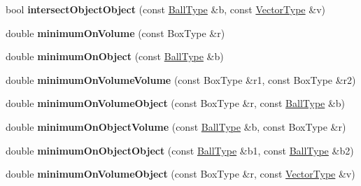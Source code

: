 \begin{DoxyCompactItemize}
\item 
\mbox{\label{struct_ball_point_stuff_ab88745ed3b3b54f82c410d91675f3be9}} 
bool {\bfseries intersect\+Object\+Object} (const \hyperlink{struct_ball}{Ball\+Type} \&b, const \hyperlink{struct_vector_type}{Vector\+Type} \&v)
\item 
\mbox{\label{struct_ball_point_stuff_a3d46c4b90956c91b849e6ceb4d2c8423}} 
double {\bfseries minimum\+On\+Volume} (const Box\+Type \&r)
\item 
\mbox{\label{struct_ball_point_stuff_a2a21e6a7f4ca3c45ede152799c1531f2}} 
double {\bfseries minimum\+On\+Object} (const \hyperlink{struct_ball}{Ball\+Type} \&b)
\item 
\mbox{\label{struct_ball_point_stuff_ae7bcb3f2b204fd91867535dcd869a433}} 
double {\bfseries minimum\+On\+Volume\+Volume} (const Box\+Type \&r1, const Box\+Type \&r2)
\item 
\mbox{\label{struct_ball_point_stuff_a3bcf3e32fe9b91adac660f17d14e15b1}} 
double {\bfseries minimum\+On\+Volume\+Object} (const Box\+Type \&r, const \hyperlink{struct_ball}{Ball\+Type} \&b)
\item 
\mbox{\label{struct_ball_point_stuff_ac5ff4bc8b68c12ea9342c2a525839bc8}} 
double {\bfseries minimum\+On\+Object\+Volume} (const \hyperlink{struct_ball}{Ball\+Type} \&b, const Box\+Type \&r)
\item 
\mbox{\label{struct_ball_point_stuff_a4dfb3e06ed68a87e41fb5928b8af3ade}} 
double {\bfseries minimum\+On\+Object\+Object} (const \hyperlink{struct_ball}{Ball\+Type} \&b1, const \hyperlink{struct_ball}{Ball\+Type} \&b2)
\item 
\mbox{\label{struct_ball_point_stuff_ac6d7b05db89a8639fe0b9dfaac19e7ef}} 
double {\bfseries minimum\+On\+Volume\+Object} (const Box\+Type \&r, const \hyperlink{struct_vector_type}{Vector\+Type} \&v)
\item 
\mbox{\label{struct_ball_point_stuff_a6887f6414530bb2859c05f20c0d2c175}} 

\end{DoxyCompactItemize}
